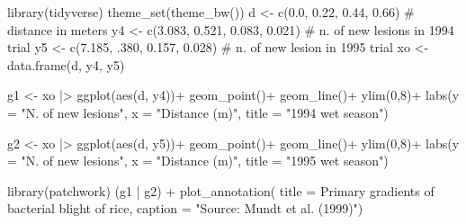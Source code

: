 \documentclass[
  letterpaper,
  DIV=11,
  numbers=noendperiod]{scrreprt}
\newenvironment{Shaded}{\begin{snugshade}}{\end{snugshade}}
\newcommand{\AttributeTok}[1]{\textcolor[rgb]{0.40,0.45,0.13}{#1}}
\newcommand{\CommentTok}[1]{\textcolor[rgb]{0.37,0.37,0.37}{#1}}
\newcommand{\DecValTok}[1]{\textcolor[rgb]{0.68,0.00,0.00}{#1}}
\newcommand{\FloatTok}[1]{\textcolor[rgb]{0.68,0.00,0.00}{#1}}
\newcommand{\FunctionTok}[1]{\textcolor[rgb]{0.28,0.35,0.67}{#1}}
\newcommand{\NormalTok}[1]{\textcolor[rgb]{0.00,0.23,0.31}{#1}}
\newcommand{\OtherTok}[1]{\textcolor[rgb]{0.00,0.23,0.31}{#1}}
\newcommand{\SpecialCharTok}[1]{\textcolor[rgb]{0.37,0.37,0.37}{#1}}
\newcommand{\StringTok}[1]{\textcolor[rgb]{0.13,0.47,0.30}{#1}}
\begin{document}
\begin{Shaded}
\begin{Highlighting}[]
\FunctionTok{library}\NormalTok{(tidyverse)}
\FunctionTok{theme\_set}\NormalTok{(}\FunctionTok{theme\_bw}\NormalTok{())}
\NormalTok{d }\OtherTok{\textless{}{-}} \FunctionTok{c}\NormalTok{(}\FloatTok{0.0}\NormalTok{, }\FloatTok{0.22}\NormalTok{, }\FloatTok{0.44}\NormalTok{, }\FloatTok{0.66}\NormalTok{) }\CommentTok{\# distance in meters}
\NormalTok{y4 }\OtherTok{\textless{}{-}} \FunctionTok{c}\NormalTok{(}\FloatTok{3.083}\NormalTok{, }\FloatTok{0.521}\NormalTok{, }\FloatTok{0.083}\NormalTok{, }\FloatTok{0.021}\NormalTok{) }\CommentTok{\# n. of new lesions in 1994 trial}
\NormalTok{y5 }\OtherTok{\textless{}{-}} \FunctionTok{c}\NormalTok{(}\FloatTok{7.185}\NormalTok{, .}\DecValTok{380}\NormalTok{, }\FloatTok{0.157}\NormalTok{, }\FloatTok{0.028}\NormalTok{) }\CommentTok{\# n. of new lesion in 1995 trial}
\NormalTok{xo }\OtherTok{\textless{}{-}} \FunctionTok{data.frame}\NormalTok{(d, y4, y5)}

\NormalTok{g1 }\OtherTok{\textless{}{-}}\NormalTok{ xo }\SpecialCharTok{|\textgreater{}} 
  \FunctionTok{ggplot}\NormalTok{(}\FunctionTok{aes}\NormalTok{(d, y4))}\SpecialCharTok{+}
  \FunctionTok{geom\_point}\NormalTok{()}\SpecialCharTok{+}
  \FunctionTok{geom\_line}\NormalTok{()}\SpecialCharTok{+}
  \FunctionTok{ylim}\NormalTok{(}\DecValTok{0}\NormalTok{,}\DecValTok{8}\NormalTok{)}\SpecialCharTok{+}
  \FunctionTok{labs}\NormalTok{(}\AttributeTok{y =} \StringTok{"N. of new lesions"}\NormalTok{,}
       \AttributeTok{x =} \StringTok{"Distance (m)"}\NormalTok{,}
       \AttributeTok{title =} \StringTok{"1994 wet season"}\NormalTok{)}

\NormalTok{g2 }\OtherTok{\textless{}{-}}\NormalTok{ xo }\SpecialCharTok{|\textgreater{}} 
  \FunctionTok{ggplot}\NormalTok{(}\FunctionTok{aes}\NormalTok{(d, y5))}\SpecialCharTok{+}
  \FunctionTok{geom\_point}\NormalTok{()}\SpecialCharTok{+}
  \FunctionTok{geom\_line}\NormalTok{()}\SpecialCharTok{+}
   \FunctionTok{ylim}\NormalTok{(}\DecValTok{0}\NormalTok{,}\DecValTok{8}\NormalTok{)}\SpecialCharTok{+}
  \FunctionTok{labs}\NormalTok{(}\AttributeTok{y =} \StringTok{"N. of new lesions"}\NormalTok{,}
       \AttributeTok{x =} \StringTok{"Distance (m)"}\NormalTok{,}
       \AttributeTok{title =} \StringTok{"1995 wet season"}\NormalTok{)}

\FunctionTok{library}\NormalTok{(patchwork)}
\NormalTok{(g1 }\SpecialCharTok{|}\NormalTok{ g2) }\SpecialCharTok{+}  \FunctionTok{plot\_annotation}\NormalTok{(}
  \AttributeTok{title =} \StringTok{\textquotesingle{}Primary gradients of bacterial blight of rice\textquotesingle{}}\NormalTok{,}
  \AttributeTok{caption =} \StringTok{"Source: Mundt et al. (1999)"}\NormalTok{)}
\end{Highlighting}
\end{Shaded}
\end{document}
